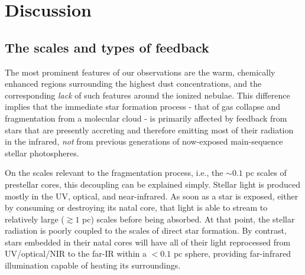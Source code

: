 \documentclass[twocolumn]{aastex61}
\begin{document}
%
%



\section{Discussion}
\label{sec:discussion}
\subsection{The scales and types of feedback}
\label{sec:feedbackscales}
The most prominent features of our observations are the warm, chemically
enhanced regions surrounding the highest dust concentrations, and the
corresponding \emph{lack} of such features around the ionized nebulae.  This
difference implies that the immediate star formation process - that of gas
collapse and fragmentation from a molecular cloud - is primarily affected by
feedback from stars that are presently accreting and therefore emitting most of
their radiation in the infrared, \emph{not} from previous generations of
now-exposed main-sequence stellar photospheres.

On the scales relevant to the fragmentation process, i.e., the $\sim0.1$ pc
scales of prestellar cores, this decoupling can be explained simply.  Stellar
light is produced mostly in the UV, optical, and near-infrared.  As soon as a
star is exposed, either by consuming or destroying its natal core, that light
is able to stream to relatively large ($\gtrsim1$ pc) scales before being
absorbed.  At that point, the stellar radiation is poorly coupled to the scales
of direct star formation.  By contrast, stars embedded in their natal cores
will have all of their light reprocessed from UV/optical/NIR to the far-IR
within a $<0.1$ pc sphere, providing far-infrared illumination capable of
heating its surroundings.
\end{document}

